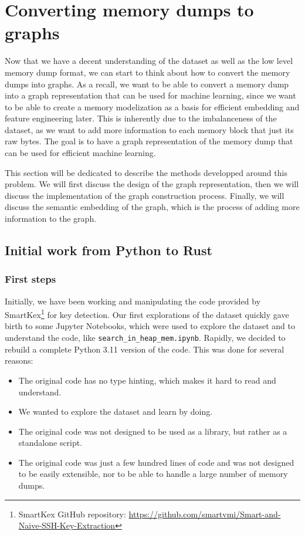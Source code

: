 \section{Converting memory dumps to graphs}\label{chap:mem_2_graph}
Now that we have a decent understanding of the dataset as well as the low level memory dump format, we can start to think about how to convert the memory dumps into graphs. As a recall, we want to be able to convert a memory dump into a graph representation that can be used for machine learning, since we want to be able to create a memory modelization as a basis for efficient embedding and feature engineering later. This is inherently due to the imbalanceness of the dataset, as we want to add more information to each memory block that just its raw bytes. The goal is to have a graph representation of the memory dump that can be used for efficient machine learning.

This section will be dedicated to describe the methods developped around this problem. We will first discuss the design of the graph representation, then we will discuss the implementation of the graph construction process. Finally, we will discuss the semantic embedding of the graph, which is the process of adding more information to the graph.

\subsection{Initial work from Python to Rust}

\subsubsection{First steps}
    Initially, we have been working and manipulating the code provided by SmartKex\footnote{SmartKex GitHub repository: \url{https://github.com/smartvmi/Smart-and-Naive-SSH-Key-Extraction}} for key detection. Our first explorations of the dataset quickly gave birth to some Jupyter Notebooks, which were used to explore the dataset and to understand the code, like \texttt{search\_in\_heap\_mem.ipynb}. Rapidly, we decided to rebuild a complete Python 3.11 version of the code. This was done for several reasons:

    \begin{itemize}
        \item The original code has no type hinting, which makes it hard to read and understand.
        \item We wanted to explore the dataset and learn by doing.
        \item The original code was not designed to be used as a library, but rather as a standalone script.
        \item The original code was just a few hundred lines of code and was not designed to be easily extensible, nor to be able to handle a large number of memory dumps.
    \end{itemize}

